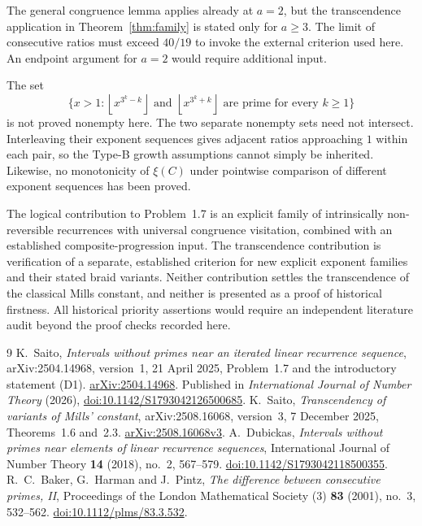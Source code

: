 \documentclass[11pt,a4paper]{article}
\theoremstyle{definition}\newtheorem{definition}[theorem]{Definition}
\theoremstyle{remark}\newtheorem{remark}[theorem]{Remark}
\newcommand{\floor}[1]{\left\lfloor #1\right\rfloor}\newcommand{\ceil}[1]{\left\lceil #1\right\rceil}
\begin{document}
The general congruence lemma applies already at $a=2$, but the
transcendence application in Theorem~\ref{thm:family} is stated only
for $a\ge3$. The limit of consecutive ratios must exceed $40/19$
to invoke the external criterion used here. An endpoint argument for
$a=2$ would require additional input.

The set
\[
 \{x>1:\floor{x^{3^k-k}}\text{ and }\floor{x^{3^k+k}}
 \text{ are prime for every }k\ge1\}
\]
is not proved nonempty here. The two separate nonempty sets need not
intersect. Interleaving their exponent sequences gives adjacent ratios
approaching $1$ within each pair, so the Type-B growth assumptions
cannot simply be inherited. Likewise, no monotonicity of $\xi(C)$
under pointwise comparison of different exponent sequences has been
proved.

The logical contribution to Problem~1.7 is an explicit family of
intrinsically non-reversible recurrences with universal congruence
visitation, combined with an established composite-progression input.
The transcendence contribution is verification of a separate,
established criterion for new explicit exponent families and their
stated braid variants. Neither contribution settles the transcendence
of the classical Mills constant, and neither is presented as a proof
of historical firstness. All historical priority assertions would
require an independent literature audit beyond the proof checks
recorded here.

\begin{thebibliography}{9}
K.~Saito, \emph{Intervals without primes near an iterated linear
recurrence sequence}, arXiv:2504.14968, version~1, 21 April 2025,
Problem~1.7 and the introductory statement (D1).
\href{https://arxiv.org/abs/2504.14968}{arXiv:2504.14968}.
Published in \emph{International Journal of Number Theory} (2026),
\href{https://doi.org/10.1142/S1793042126500685}
{doi:10.1142/S1793042126500685}.
K.~Saito, \emph{Transcendency of variants of Mills' constant},
arXiv:2508.16068, version~3, 7 December 2025, Theorems~1.6 and~2.3.
\href{https://arxiv.org/abs/2508.16068v3}{arXiv:2508.16068v3}.
A.~Dubickas, \emph{Intervals without primes near elements of linear
recurrence sequences}, International Journal of Number Theory
\textbf{14} (2018), no.~2, 567--579.
\href{https://doi.org/10.1142/S1793042118500355}
{doi:10.1142/S1793042118500355}.
R.~C.~Baker, G.~Harman and J.~Pintz,
\emph{The difference between consecutive primes, II},
Proceedings of the London Mathematical Society (3)
\textbf{83} (2001), no.~3, 532--562.
\href{https://doi.org/10.1112/plms/83.3.532}
{doi:10.1112/plms/83.3.532}.
\end{thebibliography}
\end{document}
